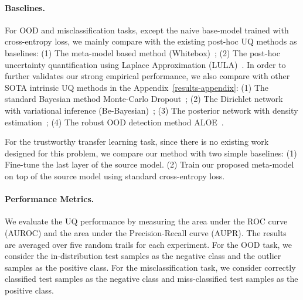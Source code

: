 \paragraph{Baselines.}
For OOD and misclassification tasks, except the naive base-model trained with cross-entropy loss, we mainly compare with the existing post-hoc UQ methods as baselines: (1) The meta-model based method (Whitebox)~\citep{chen2019confidence}; (2) The post-hoc uncertainty quantification using Laplace Approximation (LULA)~\citep{kristiadi2021learnable}. In order to further validates our strong empirical performance, we also compare with other SOTA intrinsic UQ methods in the Appendix~\ref{results-appendix}: (1) The standard Bayesian method Monte-Carlo Dropout~\citep{gal2016dropout}; (2) The Dirichlet network with variational inference (Be-Bayesian)~\citep{joo2020being}; (3) The posterior network with density estimation~\citep{charpentier2020posterior}; (4) The robust OOD detection method ALOE~\citep{chen2020robust}.

For the trustworthy transfer learning task, since there is no existing work designed for this problem, we compare our method with two simple baselines: (1) Fine-tune the last layer of the source model. (2) Train our proposed meta-model on top of the source model using standard cross-entropy loss.

\paragraph{Performance Metrics.}
We evaluate the UQ performance by measuring the area under the ROC curve (AUROC) and the area under the Precision-Recall curve (AUPR). The results are averaged over five random trails for each experiment. For the OOD task, we consider the in-distribution test samples as the negative class and the outlier samples as the positive class. For the misclassification task, we consider correctly classified test samples as the negative class and miss-classified test samples as the positive class.

